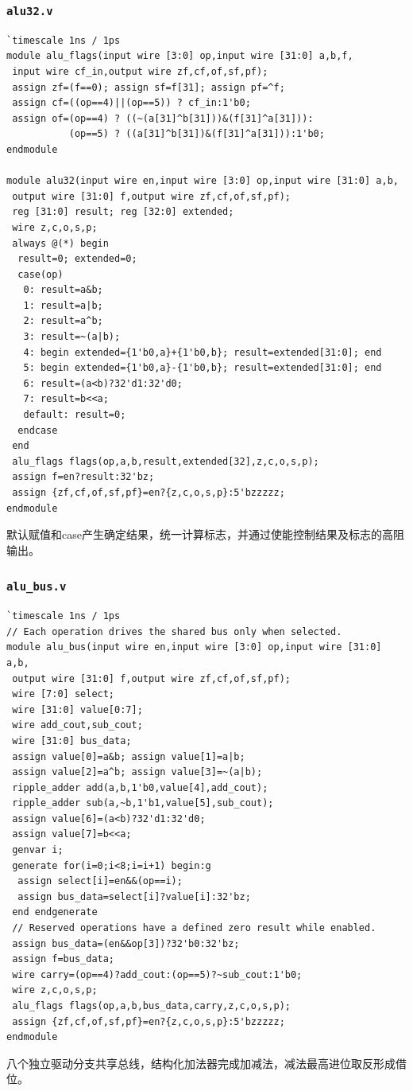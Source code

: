 \documentclass[12pt,a4paper]{ctexart}
\begin{document}
\subsubsection*{\texttt{alu32.v}}
\begin{lstlisting}
`timescale 1ns / 1ps
module alu_flags(input wire [3:0] op,input wire [31:0] a,b,f,
 input wire cf_in,output wire zf,cf,of,sf,pf);
 assign zf=(f==0); assign sf=f[31]; assign pf=^f;
 assign cf=((op==4)||(op==5)) ? cf_in:1'b0;
 assign of=(op==4) ? ((~(a[31]^b[31]))&(f[31]^a[31])):
           (op==5) ? ((a[31]^b[31])&(f[31]^a[31])):1'b0;
endmodule

module alu32(input wire en,input wire [3:0] op,input wire [31:0] a,b,
 output wire [31:0] f,output wire zf,cf,of,sf,pf);
 reg [31:0] result; reg [32:0] extended;
 wire z,c,o,s,p;
 always @(*) begin
  result=0; extended=0;
  case(op)
   0: result=a&b;
   1: result=a|b;
   2: result=a^b;
   3: result=~(a|b);
   4: begin extended={1'b0,a}+{1'b0,b}; result=extended[31:0]; end
   5: begin extended={1'b0,a}-{1'b0,b}; result=extended[31:0]; end
   6: result=(a<b)?32'd1:32'd0;
   7: result=b<<a;
   default: result=0;
  endcase
 end
 alu_flags flags(op,a,b,result,extended[32],z,c,o,s,p);
 assign f=en?result:32'bz;
 assign {zf,cf,of,sf,pf}=en?{z,c,o,s,p}:5'bzzzzz;
endmodule
\end{lstlisting}
默认赋值和case产生确定结果，统一计算标志，并通过使能控制结果及标志的高阻输出。

\subsubsection*{\texttt{alu\_bus.v}}
\begin{lstlisting}
`timescale 1ns / 1ps
// Each operation drives the shared bus only when selected.
module alu_bus(input wire en,input wire [3:0] op,input wire [31:0] a,b,
 output wire [31:0] f,output wire zf,cf,of,sf,pf);
 wire [7:0] select;
 wire [31:0] value[0:7];
 wire add_cout,sub_cout;
 wire [31:0] bus_data;
 assign value[0]=a&b; assign value[1]=a|b;
 assign value[2]=a^b; assign value[3]=~(a|b);
 ripple_adder add(a,b,1'b0,value[4],add_cout);
 ripple_adder sub(a,~b,1'b1,value[5],sub_cout);
 assign value[6]=(a<b)?32'd1:32'd0;
 assign value[7]=b<<a;
 genvar i;
 generate for(i=0;i<8;i=i+1) begin:g
  assign select[i]=en&&(op==i);
  assign bus_data=select[i]?value[i]:32'bz;
 end endgenerate
 // Reserved operations have a defined zero result while enabled.
 assign bus_data=(en&&op[3])?32'b0:32'bz;
 assign f=bus_data;
 wire carry=(op==4)?add_cout:(op==5)?~sub_cout:1'b0;
 wire z,c,o,s,p;
 alu_flags flags(op,a,b,bus_data,carry,z,c,o,s,p);
 assign {zf,cf,of,sf,pf}=en?{z,c,o,s,p}:5'bzzzzz;
endmodule
\end{lstlisting}
八个独立驱动分支共享总线，结构化加法器完成加减法，减法最高进位取反形成借位。
\end{document}
